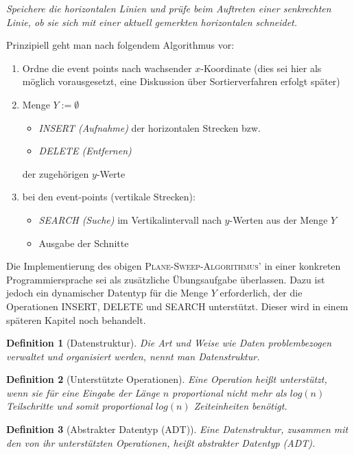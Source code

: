 \documentclass{scrreprt}%
\theoremstyle{break}
\newtheorem{definition}{Definition}
\begin{document}
\textit{Speichere die horizontalen Linien und prüfe beim Auftreten einer
senkrechten Linie, ob sie sich mit einer aktuell gemerkten horizontalen
schneidet.}

Prinzipiell geht man nach folgendem Algorithmus vor:
\begin{enumerate}
 \item Ordne die event points nach wachsender $x$-Koordinate (dies sei hier
  als möglich vorausgesetzt, eine Diskussion über Sortierverfahren erfolgt
  später)
 \item Menge $Y := \emptyset$  
  \begin{itemize}
   \item \textit{INSERT (Aufnahme)} der horizontalen Strecken bzw.
   \item \textit{DELETE (Entfernen)}
  \end{itemize}
  der zugehörigen $y$-Werte
 \item bei den event-points (vertikale Strecken):
  \begin{itemize}
   \item \textit{SEARCH (Suche)} im Vertikalintervall nach $y$-Werten aus der 
    Menge $Y$
   \item Ausgabe der Schnitte
  \end{itemize}
\end{enumerate}

Die Implementierung des obigen
\textsc{Plane-Sweep-Algorithmus'} in einer konkreten Programmiersprache
sei als zusätzliche Übungsaufgabe überlassen. Dazu ist jedoch ein dynamischer
Datentyp für die Menge $Y$ erforderlich, der die Operationen INSERT,
DELETE und SEARCH unterstützt. Dieser wird in einem späteren Kapitel noch behandelt. 

\begin{definition}[Datenstruktur]
  Die Art und Weise wie Daten problembezogen verwaltet und organisiert
  werden, nennt man Datenstruktur.
\end{definition}

\label{ADT}
\begin{definition}[Unterstützte Operationen]
  Eine Operation heißt unterstützt, wenn sie für eine Eingabe
  der Länge $n$ proportional nicht mehr als $log(n)$ Teilschritte und
  somit proportional $log(n)$ Zeiteinheiten benötigt.
\end{definition}

\begin{definition}[Abstrakter Datentyp (ADT)]
  Eine Datenstruktur, zusammen mit den von ihr unterstützten Operationen, 
  heißt abstrakter Datentyp (ADT).
\end{definition}
\end{document}
